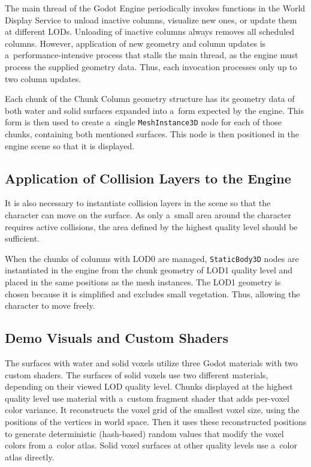 The main thread of the Godot Engine periodically invokes functions in the World Display Service to unload inactive columns, visualize new ones, or update them at different LODs. Unloading of inactive columns always removes all scheduled columns. However, application of new geometry and column updates is a~performance-intensive process that stalls the main thread, as the engine must process the supplied geometry data. Thus, each invocation processes only up to two column updates.

Each chunk of the Chunk Column geometry structure has its geometry data of both water and solid surfaces expanded into a~form expected by the engine. This form is then used to create a~single \texttt{MeshInstance3D} node for each of those chunks, containing both mentioned surfaces. This node is then positioned in the engine scene so that it is displayed.

\subsection{Application of Collision Layers to the Engine}

It is also necessary to instantiate collision layers in the scene so that the character can move on the surface. As only a~small area around the character requires active collisions, the area defined by the highest quality level should be sufficient.

When the chunks of columns with LOD0 are managed, \texttt{StaticBody3D} nodes are instantiated in the engine from the chunk geometry of LOD1 quality level and placed in the same positions as the mesh instances. The LOD1 geometry is chosen because it is simplified and excludes small vegetation. Thus, allowing the character to move freely.

\subsection{Demo Visuals and Custom Shaders}

The surfaces with water and solid voxels utilize three Godot materials with two custom shaders. The surfaces of solid voxels use two different materials, depending on their viewed LOD quality level. Chunks displayed at the highest quality level use material with a~custom fragment shader that adds per-voxel color variance. It reconstructs the voxel grid of the smallest voxel size, using the positions of the vertices in world space. Then it uses these reconstructed positions to generate deterministic (hash-based) random values that modify the voxel colors from a~color atlas. Solid voxel surfaces at other quality levels use a~color atlas directly.

